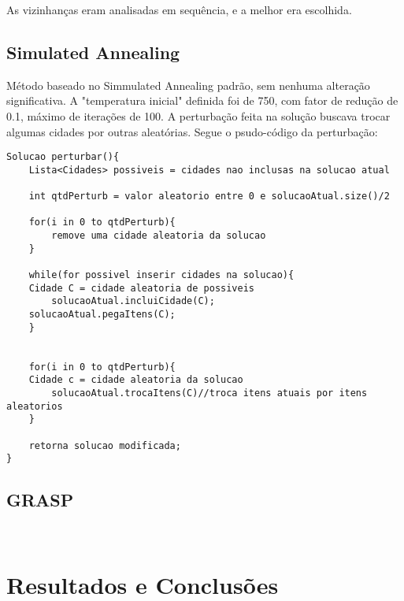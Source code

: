 \documentclass[12pt,14paper,onecolumn]{article}
\begin{document}
As vizinhanças eram analisadas em sequência, e a melhor era escolhida.

\subsection{Simulated Annealing}

Método baseado no Simmulated Annealing padrão, sem nenhuma alteração significativa.
A "temperatura inicial" definida foi de 750, com fator de redução de 0.1, máximo de iterações de 100.
A perturbação feita na solução buscava trocar algumas cidades por outras aleatórias.
Segue o psudo-código da perturbação:

\begin{lstlisting}
Solucao perturbar(){
	Lista<Cidades> possiveis = cidades nao inclusas na solucao atual
	
	int qtdPerturb = valor aleatorio entre 0 e solucaoAtual.size()/2

	for(i in 0 to qtdPerturb){
		remove uma cidade aleatoria da solucao
	}

	while(for possivel inserir cidades na solucao){
    Cidade C = cidade aleatoria de possiveis
		solucaoAtual.incluiCidade(C);
    solucaoAtual.pegaItens(C);
	}


	for(i in 0 to qtdPerturb){
    Cidade c = cidade aleatoria da solucao
		solucaoAtual.trocaItens(C)//troca itens atuais por itens aleatorios
	}

	retorna solucao modificada;
}

\end{lstlisting}

\subsection{GRASP}

\begin{lstlisting}


\end{lstlisting}


\section{Resultados e Conclusões}
\end{document}
